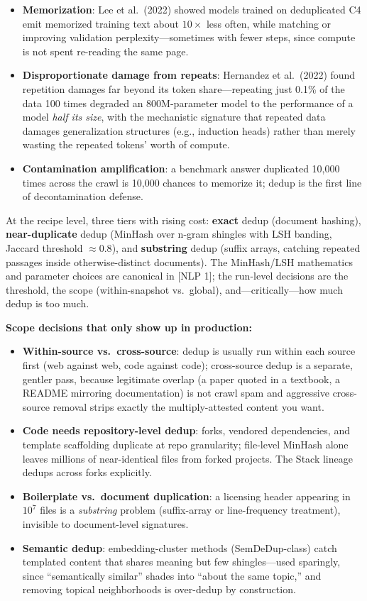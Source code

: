 \begin{itemize}
    \item \textbf{Memorization}: Lee et al.\ (2022) showed models trained on deduplicated C4 emit memorized training text about $10\times$ less often, while matching or improving validation perplexity---sometimes with fewer steps, since compute is not spent re-reading the same page.
    \item \textbf{Disproportionate damage from repeats}: Hernandez et al.\ (2022) found repetition damages far beyond its token share---repeating just 0.1\% of the data 100 times degraded an 800M-parameter model to the performance of a model \textit{half its size}, with the mechanistic signature that repeated data damages generalization structures (e.g., induction heads) rather than merely wasting the repeated tokens' worth of compute.
    \item \textbf{Contamination amplification}: a benchmark answer duplicated 10,000 times across the crawl is 10,000 chances to memorize it; dedup is the first line of decontamination defense.
\end{itemize}

At the recipe level, three tiers with rising cost: \textbf{exact} dedup (document hashing), \textbf{near-duplicate} dedup (MinHash over n-gram shingles with LSH banding, Jaccard threshold $\approx 0.8$), and \textbf{substring} dedup (suffix arrays, catching repeated passages inside otherwise-distinct documents). The MinHash/LSH mathematics and parameter choices are canonical in [NLP 1]; the run-level decisions are the threshold, the scope (within-snapshot vs.\ global), and---critically---how much dedup is too much.

\textbf{Scope decisions that only show up in production:}
\begin{itemize}
    \item \textbf{Within-source vs.\ cross-source}: dedup is usually run within each source first (web against web, code against code); cross-source dedup is a separate, gentler pass, because legitimate overlap (a paper quoted in a textbook, a README mirroring documentation) is not crawl spam and aggressive cross-source removal strips exactly the multiply-attested content you want.
    \item \textbf{Code needs repository-level dedup}: forks, vendored dependencies, and template scaffolding duplicate at repo granularity; file-level MinHash alone leaves millions of near-identical files from forked projects. The Stack lineage dedups across forks explicitly.
    \item \textbf{Boilerplate vs.\ document duplication}: a licensing header appearing in $10^7$ files is a \textit{substring} problem (suffix-array or line-frequency treatment), invisible to document-level signatures.
    \item \textbf{Semantic dedup}: embedding-cluster methods (SemDeDup-class) catch templated content that shares meaning but few shingles---used sparingly, since ``semantically similar'' shades into ``about the same topic,'' and removing topical neighborhoods is over-dedup by construction.
\end{itemize}


